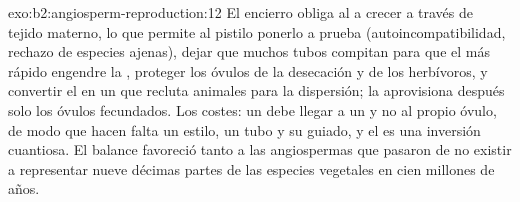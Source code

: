 \begin{solution}{exo:b2:angiosperm-reproduction:12}
El encierro obliga al  a crecer a través de tejido materno, lo que
permite al pistilo ponerlo a prueba (autoincompatibilidad, rechazo de
especies ajenas), dejar que muchos tubos compitan para que el más rápido
engendre la , proteger los óvulos de la desecación y de los
herbívoros, y convertir el  en un  que recluta animales para
la dispersión; la  aprovisiona después solo los óvulos
fecundados. Los costes: un  debe llegar a un  y no
al propio óvulo, de modo que hacen falta un estilo, un tubo y su guiado,
y el  es una inversión cuantiosa. El balance favoreció tanto a las
angiospermas que pasaron de no existir a representar nueve décimas partes
de las especies vegetales en cien millones de años.
\end{solution}

